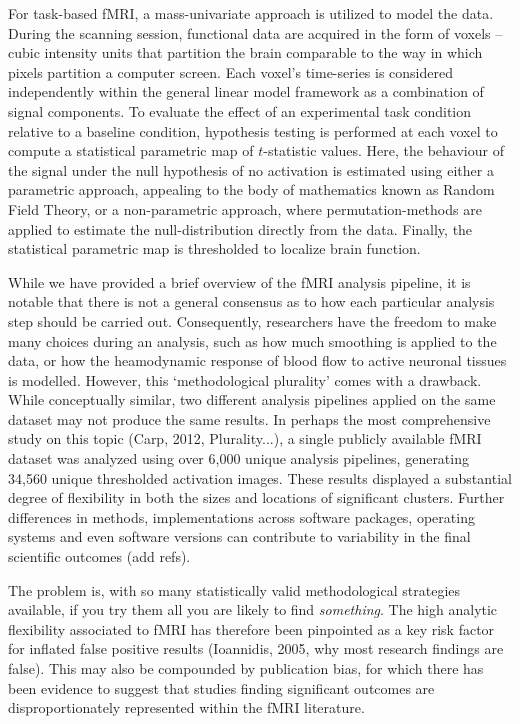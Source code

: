 For task-based fMRI, a mass-univariate approach is utilized to model the data. During the scanning session, functional data are acquired in the form of voxels -- cubic intensity units that partition the brain comparable to the way in which pixels partition a computer screen. Each voxel's time-series is considered independently within the general linear model framework as a combination of signal components. To evaluate the effect of an experimental task condition relative to a baseline condition, hypothesis testing is performed at each voxel to compute a statistical parametric map of $t$-statistic values. Here, the behaviour of the signal under the null hypothesis of no activation is estimated using either a parametric approach, appealing to the body of mathematics known as Random Field Theory, or a non-parametric approach, where permutation-methods are applied to estimate the null-distribution directly from the data. Finally, the statistical parametric map is thresholded to localize brain function. 

While we have provided a brief overview of the fMRI analysis pipeline, it is notable that there is not a general consensus as to how each particular analysis step should be carried out. Consequently, researchers have the freedom to make many choices during an analysis, such as how much smoothing is applied to the data, or how the heamodynamic response of blood flow to active neuronal tissues is modelled. However, this `methodological plurality' comes with a drawback. While conceptually similar, two different analysis pipelines applied on the same dataset may not produce the same results. In perhaps the most comprehensive study on this topic (Carp, 2012, Plurality...), a single publicly available fMRI dataset was analyzed using over 6,000 unique analysis pipelines, generating 34,560 unique thresholded activation images. These results displayed a substantial degree of flexibility in both the sizes and locations of significant clusters. Further differences in methods, implementations across software packages, operating systems and even software versions can contribute to variability in the final scientific outcomes (add refs). 

The problem is, with so many statistically valid methodological strategies available, if you try them all you are likely to find \textit{something}. The high analytic flexibility associated to fMRI has therefore been pinpointed as a key risk factor for inflated false positive results (Ioannidis, 2005, why most research findings are false). This may also be compounded by publication bias, for which there has been evidence to suggest that studies finding significant outcomes are disproportionately represented within the fMRI literature. 

